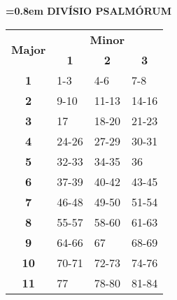 \documentclass[twoside,11pt]{article}
\begin{document}
\newpage
\pagestyle{myheadings}
\setcounter{page}{1}

{
  {
    \begin{center}
    {\bfseries{}\font=0.8em DIVÍSIO PSALMÓRUM}
    \end{center}
  }

  {
    \begin{table}[ht]
    \centering
    \begin{tabular}{|cccc|}
    \hline
    \multicolumn{1}{|c|}{\multirow{2}{*}{\textbf{Major}}} & \multicolumn{3}{c|}{\textbf{Minor}}   \\ \cline{2-4}
    \multicolumn{1}{|c|}{}   & \multicolumn{1}{c|}{\textbf{1}} & \multicolumn{1}{c|}{\textbf{2}} & \multicolumn{1}{c|}{\textbf{3}} \\ \hline
    \multicolumn{1}{|c|}{\textbf{1}}  & \multicolumn{1}{l|}{1-3} & \multicolumn{1}{l|}{4-6} & \multicolumn{1}{l|}{7-8} \\ \hline
    \multicolumn{1}{|c|}{\textbf{2}}  & \multicolumn{1}{l|}{9-10} & \multicolumn{1}{l|}{11-13} & \multicolumn{1}{l|}{14-16} \\ \hline
    \multicolumn{1}{|c|}{\textbf{3}}  & \multicolumn{1}{l|}{17} & \multicolumn{1}{l|}{18-20} & \multicolumn{1}{l|}{21-23} \\ \hline
    \multicolumn{1}{|c|}{\textbf{4}}  & \multicolumn{1}{l|}{24-26} & \multicolumn{1}{l|}{27-29} & \multicolumn{1}{l|}{30-31} \\ \hline
    \multicolumn{1}{|c|}{\textbf{5}}  & \multicolumn{1}{l|}{32-33} & \multicolumn{1}{l|}{34-35} & \multicolumn{1}{l|}{36} \\ \hline
    \multicolumn{1}{|c|}{\textbf{6}}  & \multicolumn{1}{l|}{37-39} & \multicolumn{1}{l|}{40-42} & \multicolumn{1}{l|}{43-45} \\ \hline
    \multicolumn{1}{|c|}{\textbf{7}}  & \multicolumn{1}{l|}{46-48} & \multicolumn{1}{l|}{49-50} & \multicolumn{1}{l|}{51-54} \\ \hline
    \multicolumn{1}{|c|}{\textbf{8}}  & \multicolumn{1}{l|}{55-57} & \multicolumn{1}{l|}{58-60} & \multicolumn{1}{l|}{61-63} \\ \hline
    \multicolumn{1}{|c|}{\textbf{9}}  & \multicolumn{1}{l|}{64-66} & \multicolumn{1}{l|}{67} & \multicolumn{1}{l|}{68-69} \\ \hline
    \multicolumn{1}{|c|}{\textbf{10}} & \multicolumn{1}{l|}{70-71} & \multicolumn{1}{l|}{72-73} & \multicolumn{1}{l|}{74-76} \\ \hline
    \multicolumn{1}{|c|}{\textbf{11}} & \multicolumn{1}{l|}{77} & \multicolumn{1}{l|}{78-80} & \multicolumn{1}{l|}{81-84} \\ \hline

\end{tabular}
\end{table}}}
\end{document}
